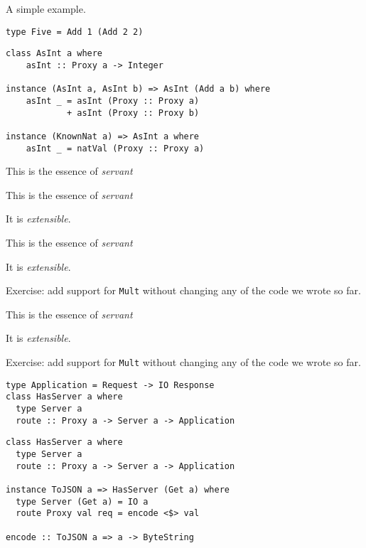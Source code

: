\documentclass{beamer}
\begin{document}
\begin{frame}[fragile]
A simple example.
\begin{verbatim}
type Five = Add 1 (Add 2 2)
\end{verbatim}

\begin{verbatim}
class AsInt a where
    asInt :: Proxy a -> Integer

instance (AsInt a, AsInt b) => AsInt (Add a b) where
    asInt _ = asInt (Proxy :: Proxy a)
            + asInt (Proxy :: Proxy b)

instance (KnownNat a) => AsInt a where
    asInt _ = natVal (Proxy :: Proxy a)
\end{verbatim}
\end{frame}

\begin{frame}
This is the essence of \textit{servant}
\end{frame}

\begin{frame}
This is the essence of \textit{servant}

It is \textit{extensible}.
\end{frame}

\begin{frame}
This is the essence of \textit{servant}

It is \textit{extensible}.

Exercise: add support for \texttt{Mult} without changing any of the code we
wrote so far.
\end{frame}

\begin{frame}
This is the essence of \textit{servant}

It is \textit{extensible}.

Exercise: add support for \texttt{Mult} without changing any of the code we
wrote so far.
\end{frame}

\begin{frame}[fragile]
\begin{verbatim}
type Application = Request -> IO Response
class HasServer a where
  type Server a
  route :: Proxy a -> Server a -> Application
\end{verbatim}
\end{frame}


\begin{frame}[fragile]
\begin{verbatim}
class HasServer a where
  type Server a
  route :: Proxy a -> Server a -> Application

instance ToJSON a => HasServer (Get a) where
  type Server (Get a) = IO a
  route Proxy val req = encode <$> val

encode :: ToJSON a => a -> ByteString
\end{verbatim}
\end{frame}
\end{document}
